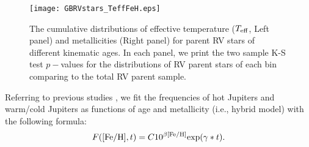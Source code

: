 \documentclass[twocolumn]{pnas-new}
\begin{document}
\begin{figure}[!t]
\centering
\texttt{[image: GBRVstars\_TeffFeH.eps]}
\caption{The cumulative distributions of effective temperature ($T_{\rm eff}$, Left panel) and metallicities (Right panel) for parent RV stars of different kinematic ages. In each panel, we print the two sample K-S test $p-$values for the distributions of RV parent stars of each bin comparing to the total RV parent sample.
\label{figGBRVTeffFeH}}
\end{figure}


Referring to previous studies \citep{2010PASP..122..905J,2016A&A...587A..64S}, we fit the frequencies of hot Jupiters and warm/cold Jupiters as functions of age and metallicity (i.e., hybrid model) with the following formula:
\begin{equation}
  F({\rm [Fe/H]}, t) = C 10^{\beta \rm [Fe/H]} {\rm exp}(\gamma*t).
\end{equation}
\end{document}
